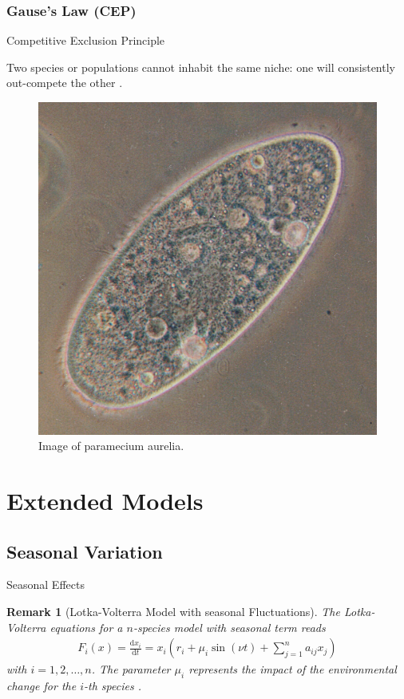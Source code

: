 \documentclass[10pt, dvipsnames]{beamer}
\newtheorem*{remark}{Remark}
\begin{document}
\subsubsection{Gause's Law (CEP)}
\begin{frame}{Competitive Exclusion Principle}


\begin{definition}
    Two species or populations cannot inhabit the same niche: one will consistently out-compete the other \cite[1 \psq, 2 \psq]{gauses_law, gauses_law2}.
\end{definition}

\begin{figure}
    \centering
    \includegraphics[width = 0.5\linewidth]{Grafiken/Paramecium.jpg}
    \caption{Image of paramecium aurelia.}
    \label{fig:paramecium}
\end{figure}
    
\end{frame}

\section{Extended Models}
\subsection{Seasonal Variation}
\begin{frame}{Seasonal Effects}

\begin{remark}[Lotka-Volterra Model with seasonal Fluctuations]
        The Lotka-Volterra equations for a $n$-species model with seasonal term reads
    \begin{align}\label{eq:lotka_volterra_with_seasons}
        F_i(x) = \frac{\mathrm{d}x_i}{\mathrm{d}t} = x_i \left(r_i + \mu_i \sin(\nu t) + \sum_{j = 1}^{n}a_{ij} x_j \right)
    \end{align}
    with $i = 1, 2, \ldots, n$. The parameter $\mu_i$ represents the impact of the environmental change for the $i$-th species \cite[7 \psq]{predatorpreymodel}.
\end{remark}
    
\end{frame}
\end{document}
